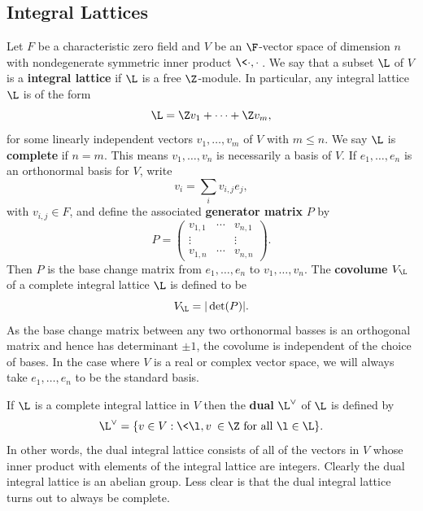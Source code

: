\documentclass[12pt]{article}
\begin{document}
    \subsection{Integral Lattices}
      Let \(F\) be a characteristic zero field and \(V\) be an \(\F\)-vector space of dimension \(n\) with nondegenerate symmetric inner product \(\<\cdot,\cdot\>\). We say that a subset \(\L\) of \(V\) is a \textbf{integral lattice} if \(\L\) is a free \(\Z\)-module. In particular, any integral lattice \(\L\) is of the form
      \[
        \L = \Z v_{1}+\cdots+\Z v_{m},
      \]
      for some linearly independent vectors \(v_{1},\ldots,v_{m}\) of \(V\) with \(m \le n\). We say \(\L\) is \textbf{complete} if \(n = m\). This means \(v_{1},\ldots,v_{n}\) is necessarily a basis of \(V\). If \(e_{1},\ldots,e_{n}\) is an orthonormal basis for \(V\), write
      \[
        v_{i} = \sum_{i}v_{i,j}e_{j},
      \]
      with \(v_{i,j} \in F\), and define the associated \textbf{generator matrix} \(P\) by
      \[
        P = \begin{pmatrix} v_{1,1} & \cdots & v_{n,1} \\ \vdots & & \vdots \\ v_{1,n} & \cdots & v_{n,n} \end{pmatrix}.
      \]
      Then \(P\) is the base change matrix from \(e_{1},\ldots,e_{n}\) to \(v_{1},\ldots,v_{n}\). The \textbf{covolume} \(V_{\L}\) of a complete integral lattice \(\L\) is defined to be
      \[
        V_{\L} = |\det(P)|.
      \]
      As the base change matrix between any two orthonormal basses is an orthogonal matrix and hence has determinant \(\pm 1\), the covolume is independent of the choice of bases. In the case where \(V\) is a real or complex vector space, we will always take \(e_{1},\ldots,e_{n}\) to be the standard basis.
      
      If \(\L\) is a complete integral lattice in \(V\) then the \textbf{dual} \(\L^{\vee}\) of \(\L\) is defined by
      \[
        \L^{\vee} = \{v \in V:\<\l,v\> \in \Z \text{ for all } \l \in \L\}.
      \]
      In other words, the dual integral lattice consists of all of the vectors in \(V\) whose inner product with elements of the integral lattice are integers. Clearly the dual integral lattice is an abelian group. Less clear is that the dual integral lattice turns out to always be complete.
\end{document}
